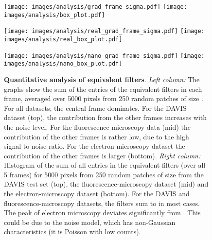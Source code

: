 \documentclass[final]{cvpr}
\begin{document}
\begin{figure}
    \centering
    \texttt{[image: images/analysis/grad\_frame\_sigma.pdf]}
    \texttt{[image: images/analysis/box\_plot.pdf]}
    
    \texttt{[image: images/analysis/real\_grad\_frame\_sigma.pdf]}
    \texttt{[image: images/analysis/real\_box\_plot.pdf]}
    
    \texttt{[image: images/analysis/nano\_grad\_frame\_sigma.pdf]}
    \texttt{[image: images/analysis/nano\_box\_plot.pdf]}
    
    \caption{\textbf{Quantitative analysis of equivalent filters}. \emph{Left column:} The graphs show the sum of the entries of the equivalent filters in each frame, averaged over 5000 pixels from 250 random patches of size . For all datasets, the central frame dominates. For the DAVIS dataset (top), the contribution from the other frames increases with the noise level.
    For the fluorescence-microscopy data (mid) the contribution of the other frames is rather low, due to the high signal-to-noise ratio. For the electron-microscopy dataset the contribution of the other frames is larger (bottom). \emph{Right column:} Histogram of the sum of all entries in the equivalent filters (over all 5 frames) for 5000 pixels from 250 random patches of size  from the DAVIS test set (top), the fluorescence-microscopy dataset (mid) and the electron-microscopy dataset (bottom). For the DAVIS and fluorescence-microscopy datasets, the filters sum to  in most cases. The peak of electron microscopy deviates significantly from . This could be due to the noise model, which has non-Gaussian characteristics (it is Poisson with low counts).}
    \label{fig:filter_sum}
\end{figure}
\end{document}
